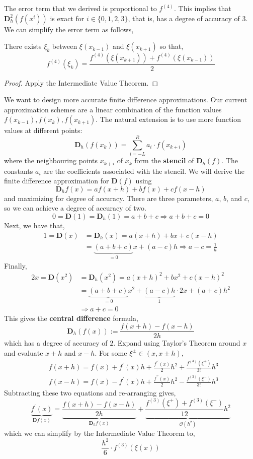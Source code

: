 \noindent The error term that we derived is proportional to $f^{(4)}$. This implies that $\mathbf{D}^2_h(f(x^i))$ is exact for $i \in \{0, 1, 2, 3\}$, that is, has a degree of accuracy of $3$. We can simplify the error term as follows,

\begin{rmk}
    There exists $\xi_k$ between $\xi(x_{k-1})$ and $\xi(x_{k+1})$ so that,
    \[f^{(4)}\left(\xi_k\right)=\frac{f^{(4)}\left(\xi\left(x_{k+1}\right)\right)+f^{(4)}\left(\xi\left(x_{k-1}\right)\right)}{2}\]
\end{rmk}

\begin{proof}
    Apply the Intermediate Value Theorem.
\end{proof}

\NewLine 

We want to design more accurate finite difference approximations. Our current approximation schemes are a linear combination of the function values $f(x_{k-1}), f(x_k), f(x_{k+1})$. The natural extension is to use more function values at different points:
\[\mathbf{D}_h (f(x_k)) = \sum_{i=-L}^R a_i \cdot f(x_{k+i})\]
where the neighbouring points $x_{k+i}$ of $x_k$ form the \textbf{stencil} of $\mathbf{D}_h(f)$. The constants $a_i$ are the coefficients associated with the stencil. We will derive the finite difference approximation for $\mathbf{D}(f)$ using
\[\mathbf{D}_h f(x)=a f(x+h)+b f(x)+c f(x-h)\]
and maximizing for degree of accuracy. There are three parameters, $a$, $b$, and $c$, so we can achieve a degree of accuracy of two.
\[0=\mathbf{D}(1)=\mathbf{D}_h(1)=a+b+c \Rightarrow a+b+c=0\]
Next, we have that,
\begin{align*}
1=\mathbf{D}(x) &=\mathbf{D}_h(x)=a(x+h)+b x+c(x-h) \\
&=\underbrace{(a+b+c)}_{=0} x+(a-c) h \Rightarrow a-c=\frac{1}{h}
\end{align*}
Finally,
\begin{align*}
2 x=\mathbf{D}(x^2) &=\mathbf{D}_h(x^2)=a(x+h)^2+b x^2+c(x-h)^2 \\
&=\underbrace{(a+b+c)}_{=0} x^2+\underbrace{(a-c) h}_1 \cdot 2 x+(a+c) h^2 \\
&\Rightarrow a+c=0
\end{align*}
This gives the \textbf{central difference} formula,
\[\mathbf{D}_h (f(x)) := \frac{f(x+h)-f(x-h)}{2 h}\]
which has a degree of accuracy of $2$. Expand using Taylor's Theorem around $x$ and evaluate $x + h$ and $x - h$. For some $\xi^{\pm} \in (x, x \pm h)$,
    \begin{align*}
    &f(x+h)=f(x)+f^{\prime}(x) h+\frac{f^{\prime \prime}(x)}{2} h^2+\frac{f^{(3)}\left(\xi^{+}\right)}{3 !} h^3 \\
    &f(x-h)=f(x)-f^{\prime}(x) h+\frac{f^{\prime \prime}(x)}{2} h^2-\frac{f^{(3)}\left(\xi^{-}\right)}{3 !} h^3
    \end{align*}
    Subtracting these two equations and re-arranging gives,
    \[\underbrace{f^{\prime}(x)}_{\mathbf{D} f(x)}=\underbrace{\frac{f(x+h)-f(x-h)}{2 h}}_{\mathbf{D}_h f(x)}+\underbrace{\frac{f^{(3)}\left(\xi^{+}\right)+f^{(3)}\left(\xi^{-}\right)}{12} h^2}_{\mathcal{O}\left(h^2\right)}\]
    which we can simplify by the Intermediate Value Theorem to,
    \[\frac{h^2}{6} \cdot f^{(3)}(\xi(x))\]

